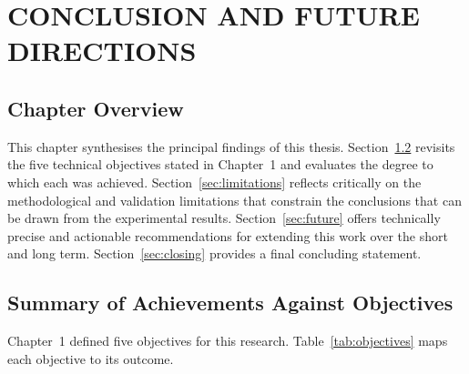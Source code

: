 \chapter{CONCLUSION AND FUTURE DIRECTIONS}
\label{ch:conclusion}

\section{Chapter Overview}

This chapter synthesises the principal findings of this thesis.
Section~\ref{sec:achievements} revisits the five technical objectives stated in Chapter~1 and evaluates the degree to which each was achieved.
Section~\ref{sec:limitations} reflects critically on the methodological and validation limitations that constrain the conclusions that can be drawn from the experimental results.
Section~\ref{sec:future} offers technically precise and actionable recommendations for extending this work over the short and long term.
Section~\ref{sec:closing} provides a final concluding statement.

\section{Summary of Achievements Against Objectives}
\label{sec:achievements}

Chapter~1 defined five objectives for this research.
Table~\ref{tab:objectives} maps each objective to its outcome.

